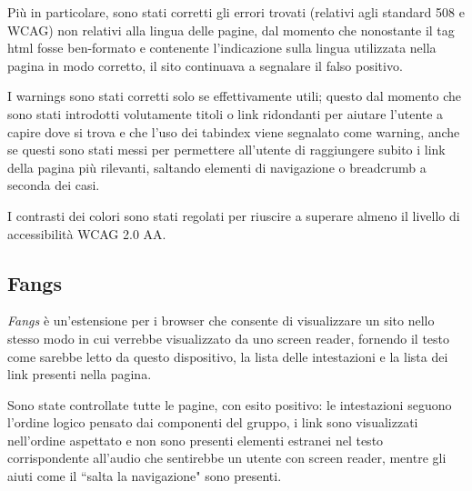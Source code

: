 Più in particolare, sono stati corretti gli errori trovati (relativi agli
standard 508 e WCAG) non relativi alla lingua delle pagine, dal momento che
nonostante il tag html fosse ben-formato e contenente l'indicazione sulla
lingua utilizzata nella pagina in modo corretto, il sito continuava a
segnalare il falso positivo.

I warnings sono stati corretti solo se effettivamente utili; questo dal
momento che sono stati introdotti volutamente titoli o link ridondanti per
aiutare l'utente a capire dove si trova e che l'uso dei tabindex viene
segnalato come warning, anche se questi sono stati messi per permettere
all'utente di raggiungere subito i link della pagina più rilevanti, saltando
elementi di navigazione o breadcrumb a seconda dei casi.

I contrasti dei colori sono stati regolati per riuscire a superare almeno il
livello di accessibilità WCAG 2.0 AA.

\subsection{Fangs}
\textit{Fangs} è un'estensione per i browser che consente di visualizzare un
sito nello stesso modo in cui verrebbe visualizzato da uno screen reader,
fornendo il testo come sarebbe letto da questo dispositivo, la lista delle
intestazioni e la lista dei link presenti nella pagina.

Sono state controllate tutte le pagine, con esito positivo: le intestazioni
seguono l'ordine logico pensato dai componenti del gruppo, i link sono
visualizzati nell'ordine aspettato e non sono presenti elementi estranei nel
testo corrispondente all'audio che sentirebbe un utente con screen reader,
mentre gli aiuti come il ``salta la navigazione" sono presenti.

